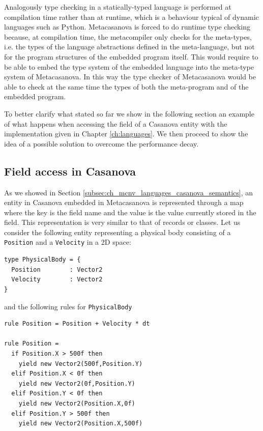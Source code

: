 \noindent
Analogously type checking in a statically-typed language is performed at compilation time rather than at runtime, which is a behaviour typical of dynamic languages such as Python. Metacasanova is forced to do runtime type checking because, at compilation time, the metacompiler only checks for the meta-types, i.e. the types of the language abstractions defined in the meta-language, but not for the program structures of the embedded program itself. This would require to be able to embed the type system of the embedded language into the meta-type system of Metacasanova. In this way the type checker of Metacasanova would be able to check at the same time the types of both the meta-program and of the embedded program. 

To better clarify what stated so far we show in the following section an example of what happens when accessing the field of a Casanova entity with the implementation given in Chapter \ref{ch:languages}. We then proceed to show the idea of a possible solution to overcome the performance decay.

\subsection{Field access in Casanova}
\label{subsec:ch_functors_casanova_example}
As we showed in Section \ref{subsec:ch_mcnv_languages_casanova_semantics}, an entity in Casanova embedded in Metacasanova is represented through a map where the key is the field name and the value is the value currently stored in the field. This representation is very similar to that of records or classes. Let us consider the following entity representing a physical body consisting of a \texttt{Position} and a \texttt{Velocity} in a 2D space:

\begin{lstlisting}
type PhysicalBody = {
  Position        : Vector2
  Velocity        : Vector2
}
\end{lstlisting}

\noindent
and the following rules for \texttt{PhysicalBody}

\begin{lstlisting}
rule Position = Position + Velocity * dt

rule Position =
  if Position.X > 500f then
    yield new Vector2(500f,Position.Y)
  elif Position.X < 0f then
    yield new Vector2(0f,Position.Y)
  elif Position.Y < 0f then
    yield new Vector2(Position.X,0f)
  elif Position.Y > 500f then
    yield new Vector2(Position.X,500f)
\end{lstlisting}

